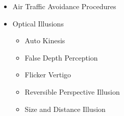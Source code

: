 \documentclass[
]{book}
\providecommand{\tightlist}{%
  \setlength{\itemsep}{0pt}\setlength{\parskip}{0pt}}
\begin{document}
\begin{itemize}
  \begin{itemize}
  \item
    Air Traffic Avoidance Procedures
  \item
    Optical Illusions

    \begin{itemize}
    \tightlist
    \item
      Auto Kinesis
    \item
      False Depth Perception
    \item
      Flicker Vertigo
    \item
      Reversible Perspective Illusion
    \item
      Size and Distance Illusion
    \end{itemize}
  \end{itemize}
\end{itemize}
\end{document}
